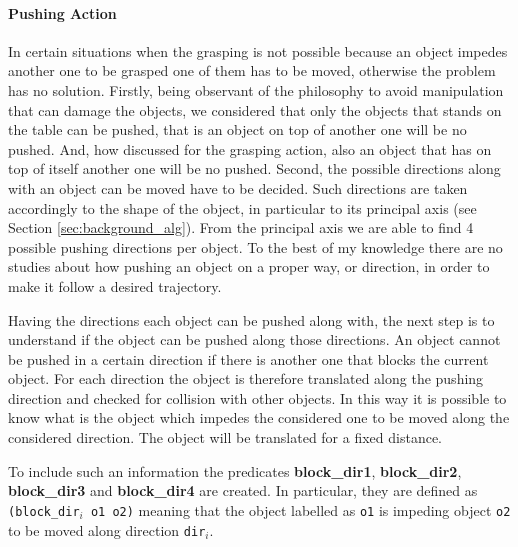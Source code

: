 \paragraph{Pushing Action}
In certain situations when the grasping is not possible because an object impedes another one to be grasped one of them has to be moved, otherwise the problem has no solution. Firstly, being observant of the philosophy to avoid manipulation that can damage the objects, we considered that only the objects that stands on the table can be pushed, that is an object on top of another one will be no pushed. And, how discussed for the grasping action, also an object that has on top of itself another one will be no pushed.
Second, the possible directions along with an object can be moved have to be decided. Such directions are taken accordingly to the shape of the object, in particular to its principal axis (see Section \ref{sec:background_alg}). From the principal axis we are able to find 4 possible pushing directions per object. To the best of my knowledge there are no studies about how pushing an object on a proper way, or direction, in order to make it follow a desired trajectory. 

Having the directions each object can be pushed along with, the next step is to understand if the object can be pushed along those directions. An object cannot be pushed in a certain direction if there is another one that blocks the current object. For each direction the object is therefore translated along the pushing direction and checked for collision with other objects. In this way it is possible to know what is the object which impedes the considered one to be moved along the considered direction. The object will be translated for a fixed distance.

To include such an information the predicates \textbf{block\_dir1}, \textbf{block\_dir2}, \textbf{block\_dir3} and \textbf{block\_dir4} are created. In particular, they are defined as \texttt{(block\_dir}$_i$\texttt{ o1 o2)} meaning that the object labelled as \texttt{o1} is impeding object \texttt{o2} to be moved along direction \texttt{dir}$_i$.

